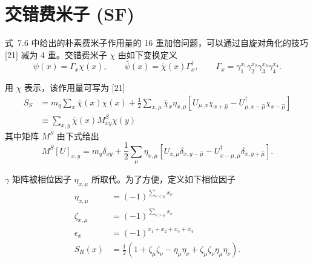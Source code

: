 \providecommand{\slashed}[1]{{\mathchoice
  {\ooalign{$\displaystyle#1$\cr\hidewidth$\displaystyle/$\hidewidth}}
  {\ooalign{$\textstyle#1$\cr\hidewidth$\textstyle/$\hidewidth}}
  {\ooalign{$\scriptstyle#1$\cr\hidewidth$\scriptstyle/$\hidewidth}}
  {\ooalign{$\scriptscriptstyle#1$\cr\hidewidth$\scriptscriptstyle/$\hidewidth}}}}

\chapter{交错费米子 (SF)}

式~7.6 中给出的朴素费米子作用量的 16 重加倍问题，可以通过自旋对角化的技巧 [21] 减为 4 重。交错费米子 $\chi$ 由如下变换定义
\begin{equation}
\psi(x) = \Gamma_x \chi(x), \qquad \bar{\psi}(x) = \bar{\chi}(x)\Gamma_x^\dagger,
\qquad \Gamma_x = \gamma_1^{x_1}\gamma_2^{x_2}\gamma_3^{x_3}\gamma_4^{x_4} .
\label{eq:sf-spin-diag}
\end{equation}

用 $\chi$ 表示，该作用量可写为 [21]
\begin{equation}
\begin{aligned}
S_S &= m_q\sum_x \bar{\chi}(x)\chi(x)
+ \frac{1}{2}\sum_{x,\mu}\bar{\chi}_x\eta_{x,\mu}
\left[U_{\mu,x}\chi_{x+\hat{\mu}} - U^\dagger_{\mu,x-\hat{\mu}}\chi_{x-\hat{\mu}}\right] \\
&\equiv \sum_{x,y} \bar{\chi}(x) M^S_{xy}\chi(y)
\end{aligned}
\label{eq:sf-action}
\end{equation}
其中矩阵 $M^S$ 由下式给出
\begin{equation}
M^S[U]_{x,y} = m_q\delta_{xy}
+ \frac{1}{2}\sum_\mu\eta_{x,\mu}
\left[U_{x,\mu}\delta_{x,y-\hat{\mu}} - U^\dagger_{x-\hat{\mu},\mu}\delta_{x,y+\hat{\mu}}\right] .
\label{eq:sf-matrix}
\end{equation}

$\gamma$ 矩阵被相位因子 $\eta_{x,\mu}$ 所取代。为了方便，定义如下相位因子
\begin{equation}
\begin{aligned}
\eta_{x,\mu} &= (-1)^{\sum_{\nu<\mu}x_\nu} \\
\zeta_{x,\mu} &= (-1)^{\sum_{\nu>\mu}x_\nu} \\
\epsilon_x &= (-1)^{x_1+x_2+x_3+x_4} \\
S_R(x) &= \frac{1}{2}\left(1 + \zeta_\mu\zeta_\nu - \eta_\mu\eta_\nu
+ \zeta_\mu\zeta_\nu\eta_\mu\eta_\nu\right) .
\end{aligned}
\label{eq:sf-phases}
\end{equation}

